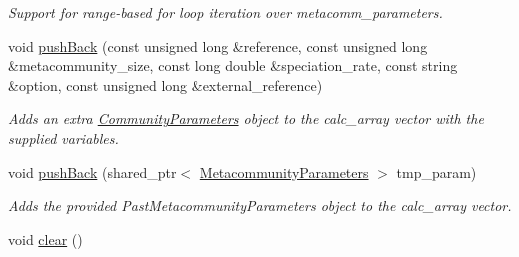\begin{DoxyCompactItemize}
\begin{DoxyCompactList}\small\item\em Support for range-\/based for loop iteration over metacomm\+\_\+parameters. \end{DoxyCompactList}\item 
void \hyperlink{struct_metacommunities_array_a3e5b4d95743b3a28a521ba627fad622a}{push\+Back} (const unsigned long \&reference, const unsigned long \&metacommunity\+\_\+size, const long double \&speciation\+\_\+rate, const string \&option, const unsigned long \&external\+\_\+reference)
\begin{DoxyCompactList}\small\item\em Adds an extra \hyperlink{struct_community_parameters}{Community\+Parameters} object to the calc\+\_\+array vector with the supplied variables. \end{DoxyCompactList}\item 
void \hyperlink{struct_metacommunities_array_a8d015063db5528131c96ee6eb2625904}{push\+Back} (shared\+\_\+ptr$<$ \hyperlink{struct_metacommunity_parameters}{Metacommunity\+Parameters} $>$ tmp\+\_\+param)
\begin{DoxyCompactList}\small\item\em Adds the provided Past\+Metacommunity\+Parameters object to the calc\+\_\+array vector. \end{DoxyCompactList}\item 
void \hyperlink{struct_metacommunities_array_aeeadf7da4469e93dd62322abe2cd2db8}{clear} ()\hypertarget{struct_metacommunities_array_aeeadf7da4469e93dd62322abe2cd2db8}{}\label{struct_metacommunities_array_aeeadf7da4469e93dd62322abe2cd2db8}


\end{DoxyCompactItemize}
